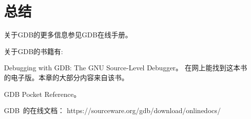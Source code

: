 \section{总结}

关于GDB的更多信息参见GDB在线手册\cite{gdb-man}。

关于GDB的书籍有:

Debugging with GDB: The GNU Source-Level Debugger\cite{debugging-with-gdb}。
在网上能找到这本书的电子版。本章的大部分内容来自该书。

GDB Pocket Reference\cite{gdb-pocket-ref}。

GDB~的在线文档：
https://sourceware.org/gdb/download/onlinedocs/
